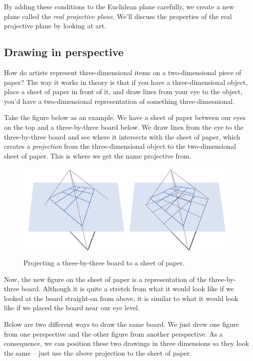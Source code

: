 \documentclass[11pt,paper=letter]{scrartcl}
\begin{document}
By adding these conditions to the Euclidean plane carefully, we create a new plane called the \emph{real projective plane}. We'll discuss the properties of the real projective plane by looking at art.

\subsection{Drawing in perspective}

How do artists represent three-dimensional items on a two-dimensional piece of paper? The way it works in theory is that if you have a three-dimensional object, place a sheet of paper in front of it, and draw lines from your eye to the object, you'd have a two-dimensional representation of something three-dimesnional.

Take the figure below as an example. We have a sheet of paper between our eyes on the top and a three-by-three board below. We draw lines from the eye to the three-by-three board and see where it intersects with the sheet of paper, which creates a \emph{projection} from the three-dimensional object to the two-dimensional sheet of paper. This is where we get the name projective from.

\begin{figure}
\centering
\includegraphics[width=\textwidth]{projection.jpg}
\caption{Projecting a three-by-three board to a sheet of paper.}
\end{figure}

Now, the new figure on the sheet of paper is a representation of the three-by-three board. Although it is quite a stretch from what it would look like if we looked at the board straight-on from above, it is similar to what it would look like if we placed the board near our eye level.

Below are two different ways to draw the same board. We just drew one figure from one perspective and the other figure from another perspective. As a consequence, we can position these two drawings in three dimensions so they look the same -- just use the above projection to the sheet of paper.
\end{document}
